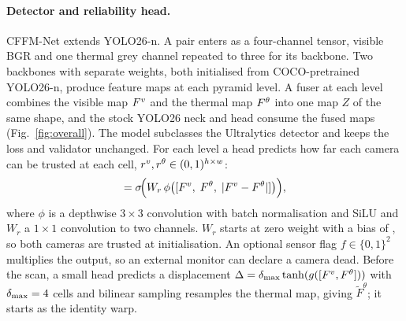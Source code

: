 \paragraph{Detector and reliability head.}
CFFM-Net extends YOLO26-n. A pair enters as a four-channel tensor, visible BGR and one thermal grey channel repeated to three for its backbone. Two backbones with separate weights, both initialised from COCO-pretrained YOLO26-n, produce feature maps at each pyramid level. A fuser at each level combines the visible map $F^{v}$ and the thermal map $F^{\theta}$ into one map $Z$ of the same shape, and the stock YOLO26 neck and head consume the fused maps (Fig.~\ref{fig:overall}). The model subclasses the Ultralytics detector and keeps the loss and validator unchanged. For each level a head predicts how far each camera can be trusted at each cell, $r^{v},r^{\theta}\in(0,1)^{h\times w}$:
\begin{equation}
[\rv,\rt]=\sigma\!\Big(W_r\,\phi\big([\Fv,\;\Ft,\;|\Fv-\Ft|]\big)\Big),
\end{equation}
where $\phi$ is a depthwise $3{\times}3$ convolution with batch normalisation and SiLU and $W_r$ a $1{\times}1$ convolution to two channels. $W_r$ starts at zero weight with a bias of \cfgInitBias{}, so both cameras are trusted at initialisation. An optional sensor flag $f\in\{0,1\}^2$ multiplies the output, so an external monitor can declare a camera dead. Before the scan, a small head predicts a displacement $\Delta=\delta_{\max}\tanh(g([F^{v},F^{\theta}]))$ with $\delta_{\max}=4{}$ cells and bilinear sampling resamples the thermal map, giving $\tilde F^{\theta}$; it starts as the identity warp.


